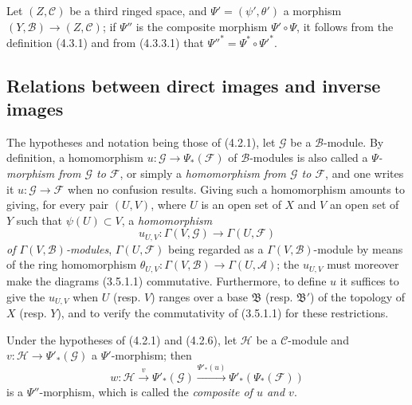 \begin{env}[4.3.6]
\label{0.4.3.6}
Let $(Z,\mathcal{C})$ be a third ringed space, and
$\Psi'=(\psi',\theta')$ a morphism $(Y,\mathcal{B})\to(Z,\mathcal{C})$;
if $\Psi''$ is the composite morphism $\Psi'\circ\Psi$, it follows from the
definition (4.3.1) and from (4.3.3.1) that
${\Psi''}^*=\Psi^*\circ{\Psi'}^*$.
\end{env}

\subsection{Relations between direct images and inverse images}
\label{subsection:0.4.4}

\begin{env}[4.4.1]
\label{0.4.4.1}
The hypotheses and notation being those of (4.2.1), let $\mathcal{G}$ be a
$\mathcal{B}$-module. By definition, a homomorphism
$u:\mathcal{G}\to\Psi_*(\mathcal{F})$ of $\mathcal{B}$-modules is
also called a \emph{$\Psi$-morphism from $\mathcal{G}$ to $\mathcal{F}$}, or
simply a \emph{homomorphism from $\mathcal{G}$ to $\mathcal{F}$}, and one
writes it $u:\mathcal{G}\to\mathcal{F}$ when no confusion results.
Giving such a homomorphism amounts to giving, for every pair $(U,V)$,
where $U$ is an open set of $X$ and $V$ an open set of $Y$ such that
$\psi(U)\subset V$, a \emph{homomorphism}
\[
  u_{U,V}:\Gamma(V,\mathcal{G})\longrightarrow\Gamma(U,\mathcal{F})
\]
\emph{of $\Gamma(V,\mathcal{B})$-modules}, $\Gamma(U,\mathcal{F})$ being
regarded as a $\Gamma(V,\mathcal{B})$-module by means of the ring
homomorphism
$\theta_{U,V}:\Gamma(V,\mathcal{B})\to\Gamma(U,\mathcal{A})$; the $u_{U,V}$
must moreover make the diagrams (3.5.1.1) commutative. Furthermore, to
define $u$ it suffices to give the $u_{U,V}$ when $U$ (resp.
$V$) ranges over a base $\mathfrak{B}$ (resp. $\mathfrak{B}'$) of the topology
of $X$ (resp. $Y$), and to verify the commutativity of (3.5.1.1) for these
restrictions.
\end{env}

\begin{env}[4.4.2]
\label{0.4.4.2}
Under the hypotheses of (4.2.1) and (4.2.6), let $\mathcal{H}$ be a
$\mathcal{C}$-module and $v:\mathcal{H}\to\Psi'_*(\mathcal{G})$ a
$\Psi'$-morphism; then
\[
  w:\mathcal{H}\xrightarrow{v}\Psi'_*(\mathcal{G})
  \xrightarrow{\Psi'_*(u)}\Psi'_*(\Psi_*(\mathcal{F}))
\]
is a $\Psi''$-morphism, which is called the \emph{composite of $u$ and $v$}.
\end{env}


